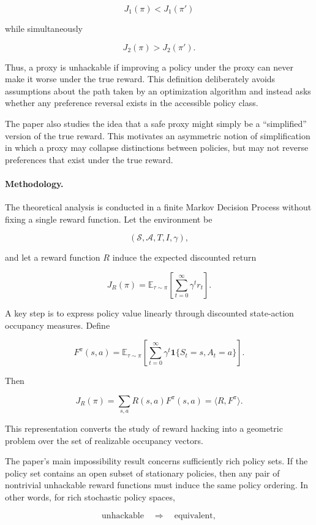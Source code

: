\documentclass[11pt]{article}
\begin{document}
\[
J_1(\pi) < J_1(\pi')
\]

while simultaneously

\[
J_2(\pi) > J_2(\pi').
\]

Thus, a proxy is unhackable if improving a policy under the proxy can never make it worse under the true reward. This definition deliberately avoids assumptions about the path taken by an optimization algorithm and instead asks whether any preference reversal exists in the accessible policy class.

The paper also studies the idea that a safe proxy might simply be a ``simplified'' version of the true reward. This motivates an asymmetric notion of simplification in which a proxy may collapse distinctions between policies, but may not reverse preferences that exist under the true reward.

\paragraph{Methodology.}

The theoretical analysis is conducted in a finite Markov Decision Process without fixing a single reward function. Let the environment be

\[
(\mathcal{S},\mathcal{A},T,I,\gamma),
\]

and let a reward function $R$ induce the expected discounted return

\[
J_R(\pi)
=
\mathbb{E}_{\tau\sim\pi}
\left[
\sum_{t=0}^{\infty}\gamma^t r_t
\right].
\]

A key step is to express policy value linearly through discounted state-action occupancy measures. Define

\[
F^\pi(s,a)
=
\mathbb{E}_{\tau\sim\pi}
\left[
\sum_{t=0}^{\infty}
\gamma^t
\mathbf{1}\{S_t=s,A_t=a\}
\right].
\]

Then

\[
J_R(\pi)
=
\sum_{s,a}
R(s,a)F^\pi(s,a)
=
\langle R,F^\pi\rangle.
\]

This representation converts the study of reward hacking into a geometric problem over the set of realizable occupancy vectors.

The paper's main impossibility result concerns sufficiently rich policy sets. If the policy set contains an open subset of stationary policies, then any pair of nontrivial unhackable reward functions must induce the same policy ordering. In other words, for rich stochastic policy spaces,

\[
\text{unhackable}
\quad\Longrightarrow\quad
\text{equivalent},
\]
\end{document}
